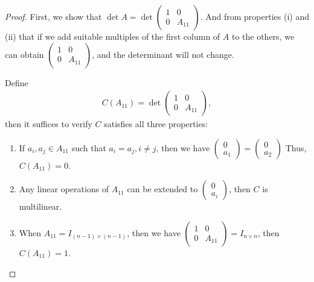 \documentclass[10pt]{book}
\theoremstyle{definition}
\numberwithin{equation}{chapter}
\begin{document}
\begin{proof}
First, we show that $\det A =\det \left(
    \begin{matrix}
        1 & 0\\
        0 & A_{11}
    \end{matrix}
    \right)$. And from properties (i) and (ii) that if we add suitable multiples of the first column of $A$ to the others, we can obtain $\left(
    \begin{matrix}
        1 & 0\\
        0 & A_{11}
    \end{matrix}
    \right)$, and the determinant will not change.

Define 
\begin{align*}
    C(A_{11}) = \det \left(
    \begin{matrix}
        1 & 0\\
        0 & A_{11}
    \end{matrix}
    \right),
\end{align*}
then it suffices to verify $C$ satisfies all three properties:
\begin{enumerate}[label=(\alph*)]
    \item If $a_i, a_j\in A_{11}$ such that $a_i = a_j, i\neq j$, then we have $\left(
    \begin{matrix}
        0\\
        a_1
    \end{matrix}
    \right) = \left(
    \begin{matrix}
        0\\
        a_2
    \end{matrix}
    \right)$ Thus, $C(A_{11}) = 0$.
    \item Any linear operations of $A_{11}$ can be extended to $\left(
    \begin{matrix}
        0\\
        a_i
    \end{matrix}
    \right)$, then $C$ is multilinear.
    \item When $A_{11} = I_{(n-1)\times(n-1)}$, then we have $\left(
    \begin{matrix}
        1 & 0\\
        0 & A_{11}
    \end{matrix}
    \right) = I_{n\times n}$, then $C(A_{11}) = 1$.
\end{enumerate}
\end{proof}
\end{document}
